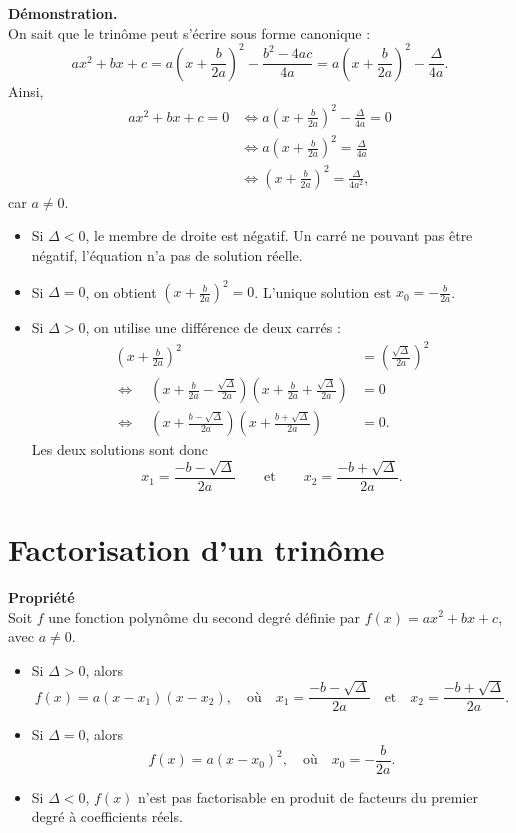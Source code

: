 \documentclass[11pt]{article}
\newenvironment{demonstration}{\par\smallskip\noindent\textbf{Démonstration. \\}\ignorespaces}{\par\smallskip}
\begin{document}
\begin{demonstration}
On sait que le trinôme peut s'écrire sous forme canonique :
\[
ax^2+bx+c
=a\left(x+\frac{b}{2a}\right)^2-\frac{b^2-4ac}{4a}
=a\left(x+\frac{b}{2a}\right)^2-\frac{\Delta}{4a}.
\]
Ainsi,
\begin{align*}
ax^2+bx+c=0
&\iff a\left(x+\frac{b}{2a}\right)^2-\frac{\Delta}{4a}=0\\
&\iff a\left(x+\frac{b}{2a}\right)^2=\frac{\Delta}{4a}\\
&\iff \left(x+\frac{b}{2a}\right)^2=\frac{\Delta}{4a^2},
\end{align*}
car $a\neq0$.

\begin{itemize}
    \item Si $\Delta<0$, le membre de droite est négatif. Un carré ne pouvant pas être négatif, l'équation n'a pas de solution réelle.
    \item Si $\Delta=0$, on obtient $\left(x+\frac{b}{2a}\right)^2=0$. L'unique solution est $x_0=-\frac{b}{2a}$.
    \item Si $\Delta>0$, on utilise une différence de deux carrés :
    \begin{align*}
    \left(x+\frac{b}{2a}\right)^2
    &=\left(\frac{\sqrt{\Delta}}{2a}\right)^2\\
    \iff\quad
    \left(x+\frac{b}{2a}-\frac{\sqrt{\Delta}}{2a}\right)
    \left(x+\frac{b}{2a}+\frac{\sqrt{\Delta}}{2a}\right)&=0\\
    \iff\quad
    \left(x+\frac{b-\sqrt{\Delta}}{2a}\right)
    \left(x+\frac{b+\sqrt{\Delta}}{2a}\right)&=0.
    \end{align*}
    Les deux solutions sont donc
    \[
    x_1=\frac{-b-\sqrt{\Delta}}{2a}
    \qquad\text{et}\qquad
    x_2=\frac{-b+\sqrt{\Delta}}{2a}.
    \]
\end{itemize}
\end{demonstration}

\section{Factorisation d'un trinôme}

\begin{propriete}
\textbf{Propriété}\\
Soit $f$ une fonction polynôme du second degré définie par $f(x)=ax^2+bx+c$, avec $a\neq0$.
\begin{itemize}
    \item Si $\Delta>0$, alors
    \[
    f(x)=a(x-x_1)(x-x_2),
    \quad\text{où}\quad
    x_1=\frac{-b-\sqrt{\Delta}}{2a}
    \quad\text{et}\quad
    x_2=\frac{-b+\sqrt{\Delta}}{2a}.
    \]
    \item Si $\Delta=0$, alors
    \[
    f(x)=a(x-x_0)^2,
    \quad\text{où}\quad
    x_0=-\frac{b}{2a}.
    \]
    \item Si $\Delta<0$, $f(x)$ n'est pas factorisable en produit de facteurs du premier degré à coefficients réels.
\end{itemize}
\end{propriete}
\end{document}
